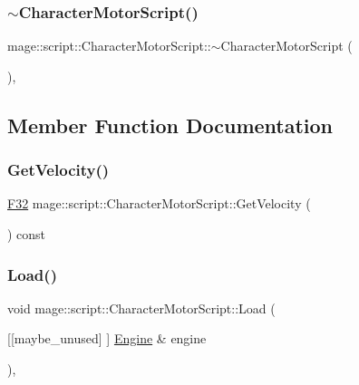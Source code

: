 \subsubsection{\texorpdfstring{$\sim$\+Character\+Motor\+Script()}{~CharacterMotorScript()}}
{\footnotesize\ttfamily mage\+::script\+::\+Character\+Motor\+Script\+::$\sim$\+Character\+Motor\+Script (\begin{DoxyParamCaption}{ }\end{DoxyParamCaption})\hspace{0.3cm}{\ttfamily [virtual]}, {\ttfamily [default]}}



\subsection{Member Function Documentation}
\mbox{\label{classmage_1_1script_1_1_character_motor_script_a24edb3337af40e7326c424bc6b93c3fa}} 
\subsubsection{\texorpdfstring{Get\+Velocity()}{GetVelocity()}}
{\footnotesize\ttfamily \mbox{\hyperlink{namespacemage_aa97e833b45f06d60a0a9c4fc22ae02c0}{F32}} mage\+::script\+::\+Character\+Motor\+Script\+::\+Get\+Velocity (\begin{DoxyParamCaption}{ }\end{DoxyParamCaption}) const\hspace{0.3cm}{\ttfamily [noexcept]}}

\mbox{\label{classmage_1_1script_1_1_character_motor_script_a20699adf280bed4bfadd4a89d7df33c1}} 
\subsubsection{\texorpdfstring{Load()}{Load()}}
{\footnotesize\ttfamily void mage\+::script\+::\+Character\+Motor\+Script\+::\+Load (\begin{DoxyParamCaption}\item[{\mbox{[}\mbox{[}maybe\+\_\+unused\mbox{]} \mbox{]} \mbox{\hyperlink{classmage_1_1_engine}{Engine}} \&}]{engine }\end{DoxyParamCaption})\hspace{0.3cm}{\ttfamily [override]}, {\ttfamily [virtual]}}

